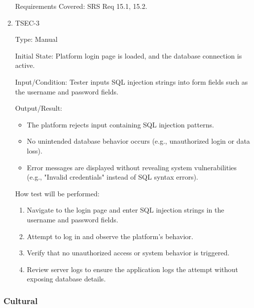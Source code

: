 \documentclass[12pt, titlepage]{article}
\begin{document}
\begin{enumerate}
          Requirements Covered: SRS Req 15.1, 15.2.

    \item{TSEC-3\\}

          Type: Manual

          Initial State: Platform login page is loaded, and the database connection is active.

          Input/Condition: Tester inputs SQL injection strings into form fields such as the username and password fields.

          Output/Result:

          \begin{itemize}
              \item{The platform rejects input containing SQL injection patterns.}
              \item{No unintended database behavior occurs (e.g., unauthorized login or data loss).}
              \item{Error messages are displayed without revealing system vulnerabilities (e.g., "Invalid credentials" instead of SQL syntax errors).}
          \end{itemize}

          How test will be performed:
          \begin{enumerate}
              \item{Navigate to the login page and enter SQL injection strings in the username and password fields.}
              \item{Attempt to log in and observe the platform's behavior.}
              \item{Verify that no unauthorized access or system behavior is triggered.}
              \item{Review server logs to ensure the application logs the attempt without exposing database details.}
          \end{enumerate}

\end{enumerate}

\subsubsection{Cultural}
\end{document}
